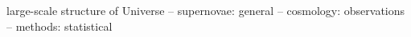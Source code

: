 large-scale structure of Universe -- supernovae: general -- cosmology: observations -- methods: statistical
